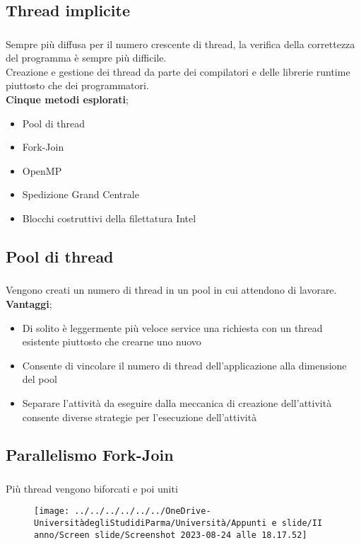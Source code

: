 \documentclass{beamer}
\newenvironment{mainframe}{
	\begin{frame}
		\frametitle{\insertsubsection}
		\framesubtitle{\insertsection}
	}{
	\end{frame}
}
\begin{document}
\subsection{Thread implicite}
\begin{mainframe}
	Sempre più diffusa per il numero crescente di thread, la verifica della correttezza del programma è sempre più difficile.\\
	Creazione e gestione dei thread da parte dei compilatori e delle librerie runtime piuttosto che dei programmatori.\\
	\textbf{Cinque metodi esplorati};
	\begin{itemize}
		\item Pool di thread
		\item Fork-Join
		\item OpenMP
		\item Spedizione Grand Centrale
		\item Blocchi costruttivi della filettatura Intel
	\end{itemize}
\end{mainframe}
\subsection{Pool di thread}
\begin{mainframe}
	Vengono creati un numero di thread in un pool in cui attendono di lavorare.\\
	\textbf{Vantaggi};
	\begin{itemize}
		\item Di solito è leggermente più veloce service una richiesta con un thread esistente piuttosto che crearne uno nuovo
		\item Consente di vincolare il numero di thread dell'applicazione alla dimensione del pool
		\item Separare l'attività da eseguire dalla meccanica di creazione dell'attività consente diverse strategie per l'esecuzione dell'attività
	\end{itemize}
\end{mainframe}
\subsection{Parallelismo Fork-Join}
\begin{mainframe}
	Più thread vengono biforcati e poi uniti
	\begin{figure}
		\centering
		\texttt{[image: ../../../../../../OneDrive-UniversitàdegliStudidiParma/Università/Appunti e slide/II anno/Screen slide/Screenshot 2023-08-24 alle 18.17.52]}
	\end{figure}
\end{mainframe}
\end{document}
